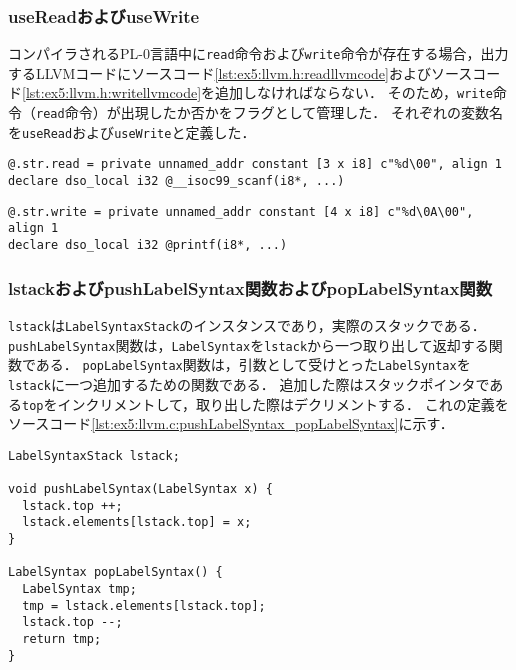 \documentclass[uplatex]{jsarticle}
\begin{document}
\subsubsection{useReadおよびuseWrite}
コンパイラされるPL-0言語中に\verb#read#命令および\verb#write#命令が存在する場合，出力するLLVMコードにソースコード\ref{lst:ex5:llvm.h:readllvmcode}およびソースコード\ref{lst:ex5:llvm.h:writellvmcode}を追加しなければならない．
そのため，\verb#write#命令（\verb#read#命令）が出現したか否かをフラグとして管理した．
それぞれの変数名を\verb#useRead#および\verb#useWrite#と定義した．

\begin{lstlisting}[caption=標準入力を行うためLLVMコード,label=lst:ex5:llvm.h:readllvmcode]
@.str.read = private unnamed_addr constant [3 x i8] c"%d\00", align 1
declare dso_local i32 @__isoc99_scanf(i8*, ...)
\end{lstlisting}

\begin{lstlisting}[caption=標準出力を行うためLLVMコード,label=lst:ex5:llvm.h:writellvmcode]
@.str.write = private unnamed_addr constant [4 x i8] c"%d\0A\00", align 1
declare dso_local i32 @printf(i8*, ...)
\end{lstlisting}


\subsubsection{lstackおよびpushLabelSyntax関数およびpopLabelSyntax関数}
\verb#lstack#は\verb#LabelSyntaxStack#のインスタンスであり，実際のスタックである．
\verb#pushLabelSyntax#関数は，\verb#LabelSyntax#を\verb#lstack#から一つ取り出して返却する関数である．
\verb#popLabelSyntax#関数は，引数として受けとった\verb#LabelSyntax#を\verb#lstack#に一つ追加するための関数である．
追加した際はスタックポインタである\verb#top#をインクリメントして，取り出した際はデクリメントする．
これの定義をソースコード\ref{lst:ex5:llvm.c:pushLabelSyntax_popLabelSyntax}に示す．

\begin{lstlisting}[caption=factorpop関数およびfactorpush関数の定義,label=lst:ex5:llvm.c:pushLabelSyntax_popLabelSyntax]
LabelSyntaxStack lstack;

void pushLabelSyntax(LabelSyntax x) {
  lstack.top ++;
  lstack.elements[lstack.top] = x;
}

LabelSyntax popLabelSyntax() {
  LabelSyntax tmp;
  tmp = lstack.elements[lstack.top];
  lstack.top --;
  return tmp;
}
\end{lstlisting}
\end{document}
